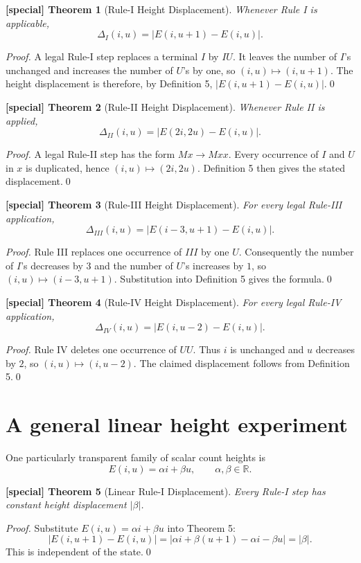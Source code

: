 \documentclass[11pt]{article}
\newtheorem{spthm}{[special] Theorem}
\begin{document}
\begin{spthm}[Rule-I Height Displacement]
Whenever Rule I is applicable,
\[\Delta_I(i,u)=|E(i,u+1)-E(i,u)|.\]
\end{spthm}
\textit{Proof.} A legal Rule-I step replaces a terminal $I$ by $IU$. It leaves the number of $I$'s unchanged and increases the number of $U$'s by one, so $(i,u)\mapsto(i,u+1)$. The height displacement is therefore, by Definition 5, $|E(i,u+1)-E(i,u)|$.\qed

\begin{spthm}[Rule-II Height Displacement]
Whenever Rule II is applied,
\[\Delta_{II}(i,u)=|E(2i,2u)-E(i,u)|.\]
\end{spthm}
\textit{Proof.} A legal Rule-II step has the form $Mx\to Mxx$. Every occurrence of $I$ and $U$ in $x$ is duplicated, hence $(i,u)\mapsto(2i,2u)$. Definition 5 then gives the stated displacement.\qed

\begin{spthm}[Rule-III Height Displacement]
For every legal Rule-III application,
\[\Delta_{III}(i,u)=|E(i-3,u+1)-E(i,u)|.\]
\end{spthm}
\textit{Proof.} Rule III replaces one occurrence of $III$ by one $U$. Consequently the number of $I$'s decreases by $3$ and the number of $U$'s increases by $1$, so $(i,u)\mapsto(i-3,u+1)$. Substitution into Definition 5 gives the formula.\qed

\begin{spthm}[Rule-IV Height Displacement]
For every legal Rule-IV application,
\[\Delta_{IV}(i,u)=|E(i,u-2)-E(i,u)|.\]
\end{spthm}
\textit{Proof.} Rule IV deletes one occurrence of $UU$. Thus $i$ is unchanged and $u$ decreases by $2$, so $(i,u)\mapsto(i,u-2)$. The claimed displacement follows from Definition 5.\qed


\section{A general linear height experiment}
One particularly transparent family of scalar count heights is
\[E(i,u)=\alpha i+\beta u,\qquad \alpha,\beta\in\mathbb R.\]

\begin{spthm}[Linear Rule-I Displacement]
Every Rule-I step has constant height displacement $|\beta|$.
\end{spthm}
\textit{Proof.} Substitute $E(i,u)=\alpha i+\beta u$ into Theorem 5:
\[
|E(i,u+1)-E(i,u)|=|\alpha i+\beta(u+1)-\alpha i-\beta u|=|\beta|.
\]
This is independent of the state.\qed
\end{document}
